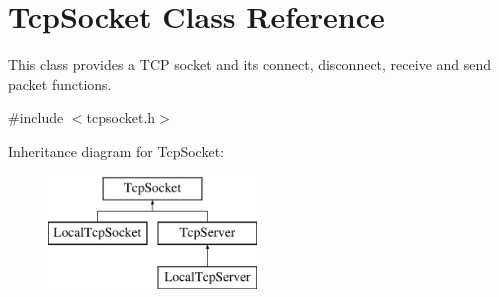 \hypertarget{class_tcp_socket}{}\section{Tcp\+Socket Class Reference}
\label{class_tcp_socket}


This class provides a T\+CP socket and its connect, disconnect, receive and send packet functions.  




{\ttfamily \#include $<$tcpsocket.\+h$>$}

Inheritance diagram for Tcp\+Socket\+:\begin{figure}[H]
\begin{center}
\leavevmode
\includegraphics[height=3.000000cm]{class_tcp_socket}
\end{center}
\end{figure}
